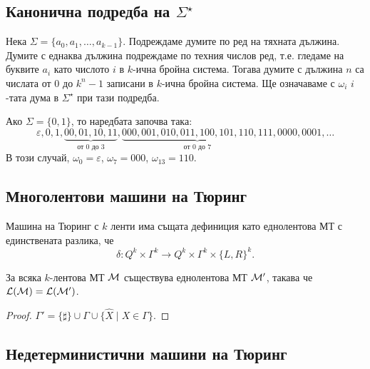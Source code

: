\subsection*{Канонична подредба на $\Sigma^\star$}

Нека $\Sigma = \{a_0,a_1,\dots,a_{k-1}\}$.
Подреждаме думите по ред на тяхната дължина.
Думите с еднаква дължина подреждаме по техния числов ред, т.е.
гледаме на буквите $a_i$ като числото $i$ в $k$-ична бройна система.
Тогава думите с дължина $n$ са числата от $0$ до $k^n-1$ записани в $k$-ична бройна система.
Ще означаваме с $\omega_i$ $i$-тата дума в $\Sigma^\star$ при тази подредба.

\begin{example}
  Ако $\Sigma = \{0,1\}$, то наредбата започва така:
  \[\varepsilon, 0, 1, \underbrace{00, 01, 10, 11}_{\text{от $0$ до $3$}}, \underbrace{000, 001, 010, 011, 100, 101, 110, 111}_{\text{от $0$ до $7$}}, 0000, 0001, \dots\]
  В този случай, $\omega_0 = \varepsilon$, $\omega_7 = 000$, $\omega_{13} = 110$.
\end{example}

\subsection*{Многолентови машини на Тюринг}


Машина на Тюринг с $k$ ленти има същата дефиниция като еднолентова МТ
с единствената разлика, че
\[\delta: Q^k \times \Gamma^k\to Q^k \times \Gamma^k \times \{L,R\}^k.\]

\begin{prop}
  За всяка $k$-лентова МТ $\mathcal{M}$ съществува еднолентова МТ $\mathcal{M}'$,
  такава че $\mathcal{L}(\mathcal{M}) = \mathcal{L}(\mathcal{M}')$.
\end{prop}
\begin{proof}
  $\Gamma' = \{\sharp\} \cup \Gamma \cup \{\hat{X} \mid X \in \Gamma\}$.
\end{proof}

\subsection*{Недетерминистични машини на Тюринг}

